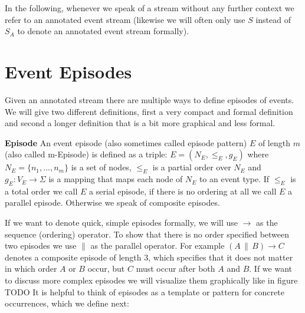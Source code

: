 In the following, whenever we speak of a stream without any further context we refer to an annotated event stream (likewise we will often only use $S$ instead of $S_A$ to denote an annotated event stream formally).


\section{Event Episodes}

Given an annotated stream there are multiple ways to define episodes of events. We will give two different definitions, first a very compact and formal definition and second a longer definition that is a bit more graphical and less formal.

\begin{mydef}
\textbf{Episode} An event episode (also sometimes called episode pattern) $E$ of length $m$ (also called m-Episode) is defined as a triple: $E = (N_E,{\leq}_{E},g_E)$ where $N_E = \{n_1,...,n_m\}$ is a set of nodes, ${\leq}_{E}$ is a partial order over $N_E$ and $g_E : V_E \rightarrow \Sigma$ is a mapping that maps each node of $N_E$ to an event type. If ${\leq}_{E}$ is a total order we call $E$ a serial episode, if there is no ordering at all we call $E$ a parallel episode. Otherwise we speak of composite episodes.
\end{mydef}

If we want to denote quick, simple episodes formally, we will use $\rightarrow$ as the sequence (ordering) operator. To show that there is no order specified between two episodes we use $\|$ as the parallel operator. For example $(A \, \| \, B ) \rightarrow C$ denotes a composite episode of length 3, which specifies that it does not matter in which order $A$ or $B$ occur, but $C$ must occur after both $A$ and $B$. If we want to discuss more complex episodes we will visualize them graphically like in figure TODO \newline  
It is helpful to think of episodes as a template or pattern for concrete occurrences, which we define next:

